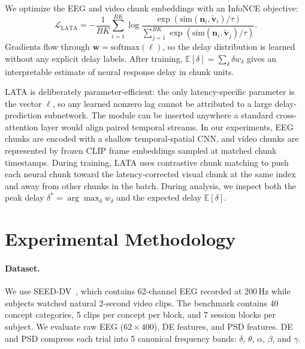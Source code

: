 \documentclass{article}
\begin{document}
We optimize the EEG and video chunk embeddings with an InfoNCE objective:
\begin{equation}
    \mathcal{L}_{\mathrm{LATA}}
    =
    -\frac{1}{BK}\sum_{i=1}^{BK}
      \log
      \frac{
        \exp(\mathrm{sim}(\mathbf{n}_i,\tilde{\mathbf{v}}_i)/\tau)}
      {\sum_{j=1}^{BK}
        \exp(\mathrm{sim}(\mathbf{n}_i,\tilde{\mathbf{v}}_j)/\tau)}.
\end{equation}
Gradients flow through $\mathbf{w}=\mathrm{softmax}(\boldsymbol{\ell})$, so the
delay distribution is learned without any explicit delay labels. After training,
$\mathbb{E}[\delta]=\sum_\delta \delta w_\delta$ gives an interpretable estimate
of neural response delay in chunk units.

LATA is deliberately parameter-efficient: the only latency-specific parameter is the vector
$\boldsymbol{\ell}$, so any learned nonzero lag cannot be attributed to a large
delay-prediction subnetwork. The module can be inserted anywhere a standard
cross-attention layer would align paired temporal streams. In our experiments,
EEG chunks are encoded with a shallow temporal-spatial CNN, and video chunks are
represented by frozen CLIP frame embeddings sampled at matched chunk timestamps.
During training, LATA uses contrastive chunk matching to push each neural chunk
toward the latency-corrected visual chunk at the same index and away from other
chunks in the batch. During analysis, we inspect both the peak delay
$\delta^*=\arg\max_\delta w_\delta$ and the expected delay
$\mathbb{E}[\delta]$.

\FloatBarrier

\section{Experimental Methodology}

\paragraph{Dataset.}
We use SEED-DV~\citep{liu2024eeg2video}, which contains 62-channel EEG recorded
at 200\,Hz while subjects watched natural 2-second video clips. The benchmark
contains 40 concept categories, 5 clips per concept per block, and 7 session
blocks per subject. We evaluate raw EEG ($62 \times 400$), DE features, and PSD
features. DE and PSD compress each trial into 5 canonical frequency bands:
$\delta$, $\theta$, $\alpha$, $\beta$, and $\gamma$.
\end{document}
